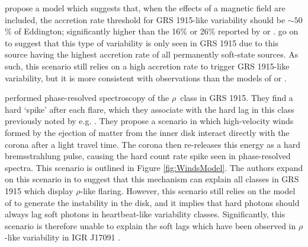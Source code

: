 \par \citealp{Zheng_Model} propose a model which suggests that, when the effects of a magnetic field are included, the accretion rate threshold for GRS 1915-like variability should be $\sim50$\% of Eddington; significantly higher than the 16\% or 26\% reported by \citealp{Janiuk_RadInstab} or \citealp{Nayakshin_GRSModel}.  \citeauthor{Zheng_Model} go on to suggest that this type of variability is only seen in GRS 1915 due to this source having the highest accretion rate of all permanently soft-state sources.  As such, this scenario still relies on a high accretion rate to trigger GRS 1915-like variability, but it is more consistent with observations than the models of \citealp{Janiuk_RadInstab} or \citealp{Nayakshin_GRSModel}.%

\label{sec:Neilsen}

\par \citealp{Neilsen_GRSModel} performed phase-resolved spectroscopy of the $\rho$\indexrho\ class in GRS 1915.  They find a hard `spike' after each flare, which they associate with the hard lag in this class previously noted by e.g. \citealp{Janiuk_Lag}.  They propose a scenario in which high-velocity winds formed by the ejection of matter from the inner disk interact directly with the corona after a light travel time.  The corona then re-releases this energy as a hard bremsstrahlung pulse, causing the hard count rate spike seen in phase-resolved spectra.  This scenario is outlined in Figure \ref{fig:WindsModel}.  The authors expand on this scenario in \citealp{Neilsen_Rho} to suggest that this mechanism can explain all classes in GRS 1915 which display $\rho$-like flaring.  However, this scenario still relies on the model of \citealp{Nayakshin_GRSModel} to generate the instability in the disk, and it implies that hard photons should always lag soft photons in heartbeat-like variability classes.  Significantly, this scenario is therefore unable to explain the soft lags which have been observed in $\rho$-like variability in IGR J17091 \citep{Altamirano_IGR_FH}.

